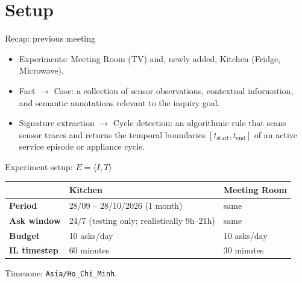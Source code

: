 \section{Setup}

\begin{frame}{Recap: previous meeting}
  \begin{itemize}
    \item \alert{Experiments:} Meeting Room (TV) and, newly added, Kitchen
          (Fridge, Microwave).
    \item \alert{Fact $\rightarrow$ Case:} a collection of sensor observations,
          contextual information, and semantic annotations relevant to the
          inquiry goal.
    \item \alert{Signature extraction $\rightarrow$ Cycle detection:} an
          algorithmic rule that scans sensor traces and returns the temporal
          boundaries $[t_{\mathrm{start}}, t_{\mathrm{end}}]$ of an active
          service episode or appliance cycle.
  \end{itemize}
\end{frame}

\begin{frame}{Experiment setup: $E=\langle I, T\rangle$}
  \small
  \renewcommand{\arraystretch}{1.4}
  \begin{tabular}{L{0.18\textwidth}|L{0.38\textwidth}|L{0.28\textwidth}}
    & \textbf{Kitchen} & \textbf{Meeting Room} \\
    \hline
    \textbf{Period} & 28/09 -- 28/10/2026 (1 month) & same \\
    \textbf{Ask window} & 24/7 (testing only; realistically 9h--21h) & same \\
    \textbf{Budget} & 10 asks/day & 10 asks/day \\
    \textbf{IL timestep} & 60 minutes & 30 minutes \\
  \end{tabular}

  \vspace{0.3cm}
  \footnotesize Timezone: \texttt{Asia/Ho\_Chi\_Minh}.
\end{frame}


